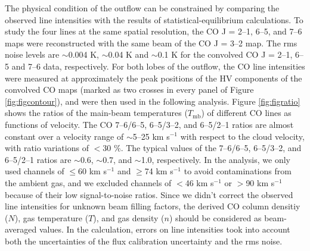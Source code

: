 The physical condition of the outflow can be constrained by comparing the observed line intensities with the results of statistical-equilibrium calculations. To study the four lines at the same spatial resolution, the CO J = 2--1, 6--5, and 7--6 maps were reconstructed with the same beam of the CO J = 3--2 map. The rms noise levels are $\sim$0.004 K, $\sim$0.04 K and $\sim$0.1 K for the convolved CO J = 2--1, 6--5 and 7--6 data, respectively. For both lobes of the outflow, the CO line intensities were measured at approximately the peak positions of the HV components of the convolved CO maps (marked as two crosses in every panel of Figure \ref{fig:figcontour}), and were then used in the following analysis. Figure \ref{fig:figratio} shows the ratios of the main-beam temperatures ($T_{\mathrm{mb}}$) of different CO lines as functions of velocity. The CO 7--6/6--5, 6--5/3--2, and 6--5/2--1 ratios are almost constant over a velocity range of $\sim$5--25 km s$^{-1}$ with respect to the cloud velocity, with ratio variations of $<$30 $\%$. The typical values of the 7--6/6--5, 6--5/3--2, and 6--5/2--1 ratios are $\sim$0.6, $\sim$0.7, and $\sim$1.0, respectively. In the analysis, we only used channels of $\le$60 km s$^{-1}$ and $\ge$74 km s$^{-1}$ to avoid contaminations from the ambient gas, and we excluded channels of $<$46 km s$^{-1}$ or $>$90 km s$^{-1}$ because of their low signal-to-noise ratios. Since we didn't correct the observed line intensities for unknown beam filling factors, the derived CO column densitiy ($N$), gas temperature ($T$), and gas density ($n$) should be considered as beam-averaged values. In the calculation, errors on line intensities took into account both the uncertainties of the flux calibration uncertainty and the rms noise. 


